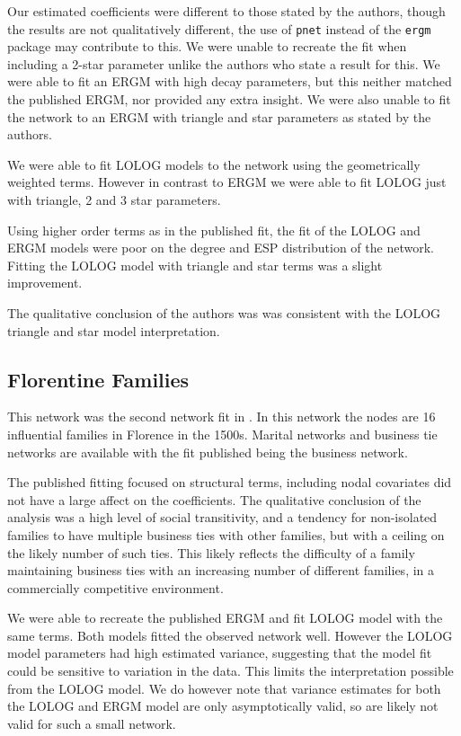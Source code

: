 \documentclass[
]{statsoc}
\begin{document}
Our estimated coefficients were different to those stated by the
authors, though the results are not qualitatively different, the use of
\texttt{pnet} instead of the \texttt{ergm} package may contribute to
this. We were unable to recreate the fit when including a 2-star
parameter unlike the authors who state a result for this. We were able
to fit an ERGM with high decay parameters, but this neither matched the
published ERGM, nor provided any extra insight. We were also unable to
fit the network to an ERGM with triangle and star parameters as stated
by the authors.

We were able to fit LOLOG models to the network using the geometrically
weighted terms. However in contrast to ERGM we were able to fit LOLOG
just with triangle, 2 and 3 star parameters.

Using higher order terms as in the published fit, the fit of the LOLOG
and ERGM models were poor on the degree and ESP distribution of the
network. Fitting the LOLOG model with triangle and star terms was a
slight improvement.

The qualitative conclusion of the authors was was consistent with the
LOLOG triangle and star model interpretation.

\subsection{Florentine Families}

This network was the second network fit in \cite{Robins2007}. In this
network the nodes are 16 influential families in Florence in the 1500s.
Marital networks and business tie networks are available with the fit
published being the business network.

The published fitting focused on structural terms, including nodal
covariates did not have a large affect on the coefficients. The
qualitative conclusion of the analysis was a high level of social
transitivity, and a tendency for non-isolated families to have multiple
business ties with other families, but with a ceiling on the likely
number of such ties. This likely reflects the difficulty of a family
maintaining business ties with an increasing number of different
families, in a commercially competitive environment.

We were able to recreate the published ERGM and fit LOLOG model with the
same terms. Both models fitted the observed network well. However the
LOLOG model parameters had high estimated variance, suggesting that the
model fit could be sensitive to variation in the data. This limits the
interpretation possible from the LOLOG model. We do however note that
variance estimates for both the LOLOG and ERGM model are only
asymptotically valid, so are likely not valid for such a small network.
\end{document}
